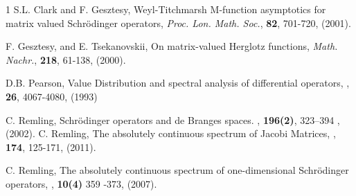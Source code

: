 \documentclass[reqno]{amsart}
\numberwithin{equation}{section}
\begin{document}
\begin{thebibliography}{1}
 S.L. Clark and F. Gesztesy, Weyl-Titchmarsh M-function asymptotics for matrix valued Schr\"odinger operators, {\it Proc. Lon. Math. Soc.}, {\bf 82}, 701-720, (2001).

 F. Gesztesy, and E. Tsekanovskii, On matrix-valued Herglotz functions, {\it Math. Nachr.}, {\bf 218}, 61-138, (2000).


D.B. Pearson,
\newblock Value Distribution and spectral analysis of differential operators,
,
 {\bf 26},  4067-4080, (1993)


 C. Remling,
   \newblock Schr\"odinger operators and de {B}ranges spaces.
  ,
    {\bf 196(2)}, 323--394 , (2002).
C. Remling,
The absolutely continuous spectrum of Jacobi Matrices,
, {\bf 174}, 125-171, (2011).

C. Remling,
\newblock The absolutely continuous spectrum of one-dimensional Schr\"odinger  operators,
, { \bf 10(4)} 359 -373, (2007).



\end{thebibliography}
\end{document}
